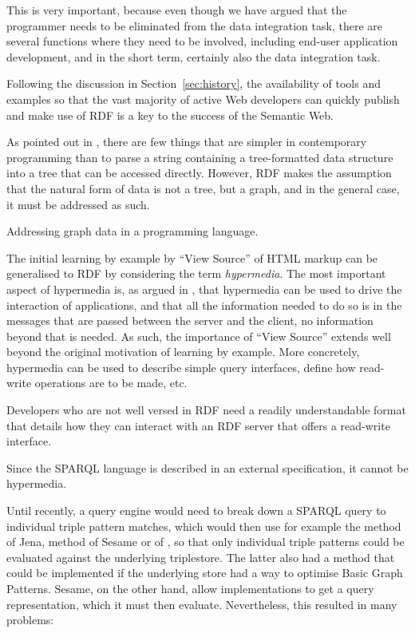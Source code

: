 This is very important, because even though we have argued that the
programmer needs to be eliminated from the data integration task,
there are several functions where they need to be involved, including
end-user application development, and in the short term, certainly
also the data integration task. 

Following the discussion in Section~\ref{sec:history}, the
availability of tools and examples so that the vast majority of active
Web developers can quickly publish and make use of RDF is a key to the
success of the Semantic Web.

As pointed out in \cite{darobin1}, there are few things that are
simpler in contemporary programming than to parse a string containing
a tree-formatted data structure into a tree that can be accessed
directly. However, RDF makes the assumption that the natural form of
data is not a tree, but a graph, and in the general case, it must be
addressed as such.

\begin{problem}\label{prob:graph}
Addressing graph data in a programming language.
\end{problem}

The initial learning by example by ``View Source'' of HTML markup can
be generalised to RDF by considering the term \emph{hypermedia}. The
most important aspect of hypermedia is, as argued in
\cite{Fielding_2000_Architectural-Styles}, that hypermedia can be used
to drive the interaction of applications, and that all the information
needed to do so is in the messages that are passed between the server
and the client, no information beyond that is needed. As such, the
importance of ``View Source'' extends well beyond the original
motivation of learning by example. More concretely, hypermedia can be
used to describe simple query interfaces, define how read-write
operations are to be made, etc. %

\begin{problem}\label{prob:lapis}
Developers who are not well versed in RDF need a readily
understandable format that details how they can interact with an RDF
server that offers a read-write interface.
\end{problem}

\begin{problem}\label{prob:tpf}
Since the SPARQL language is described in an external specification,
it cannot be hypermedia.
\end{problem}

Until recently, a query engine would need to break down a SPARQL query
to individual triple pattern matches, which would then use for example
the  method of Jena,  method
of Sesame or  of , so that only
individual triple patterns could be evaluated against the underlying
triplestore.  The latter also had a  method that
could be implemented if the underlying store had a way to optimise
Basic Graph Patterns. Sesame, on the other hand, allow implementations
to get a query representation, which it must then evaluate.
Nevertheless, this resulted in many problems:

